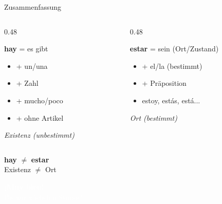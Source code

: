 \documentclass[aspectratio=169, 11pt]{beamer}
\newcommand{\es}[1]{\textbf{\textcolor{spanischrot}{#1}}}
\newcommand{\de}[1]{{\small\textcolor{dunkelgrau}{\textit{#1}}}}
\newcommand{\estar}[1]{\textbf{\textcolor{blau}{#1}}}
\begin{document}
\begin{frame}{Zusammenfassung}

\begin{columns}[T]
\begin{column}{0.48\textwidth}
\begin{block}{\es{hay} = es gibt}
\begin{itemize}
    \item + un/una
    \item + Zahl
    \item + mucho/poco
    \item + ohne Artikel
\end{itemize}
\de{Existenz (unbestimmt)}
\end{block}
\end{column}

\begin{column}{0.48\textwidth}
\begin{block}{\estar{estar} = sein (Ort/Zustand)}
\begin{itemize}
    \item + el/la (bestimmt)
    \item + Präposition
    \item estoy, estás, está...
\end{itemize}
\de{Ort (bestimmt)}
\end{block}
\end{column}
\end{columns}

\vspace{0.5cm}

\begin{center}
{\Large \es{hay} $\neq$ \estar{estar}}\\[0.3em]
{\small Existenz $\neq$ Ort}
\end{center}

\end{frame}

{
\begin{frame}[plain]
\begin{center}
\vspace{3cm}
{\Huge\bfseries\textcolor{white}{¡Muy bien!}}\\[1cm]
{\Large\textcolor{white}{Bis zur nächsten Stunde!}}
\end{center}
\end{frame}
}
\end{document}
